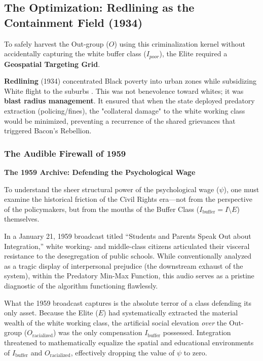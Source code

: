 \documentclass[12pt]{article}
\begin{document}
\subsection{The Optimization: Redlining as the Containment Field (1934)}
To safely harvest the Out-group ($O$) using this criminalization kernel without accidentally capturing the white buffer class ($I_{poor}$), the Elite required a \textbf{Geospatial Targeting Grid}.

\textbf{Redlining} (1934) concentrated Black poverty into urban zones while subsidizing White flight to the suburbs \cite{rothstein, coatesreparations}. This was not benevolence toward whites; it was \textbf{blast radius management}. It ensured that when the state deployed predatory extraction (policing/fines), the "collateral damage" to the white working class would be minimized, preventing a recurrence of the shared grievances that triggered Bacon's Rebellion.

\subsubsection*{The Audible Firewall of 1959}

\textbf{The 1959 Archive: Defending the Psychological Wage}

To understand the sheer structural power of the psychological wage ($\psi$), one must examine the historical friction of the Civil Rights era---not from the perspective of the policymakers, but from the mouths of the Buffer Class ($I_{\text{buffer}} = I \setminus E$) themselves.

In a January 21, 1959 broadcast titled ``Students and Parents Speak Out about Integration,'' white working- and middle-class citizens articulated their visceral resistance to the desegregation of public schools. While conventionally analyzed as a tragic display of interpersonal prejudice (the downstream exhaust of the system), within the Predatory Min-Max Function, this audio serves as a pristine diagnostic of the algorithm functioning flawlessly.

What the 1959 broadcast captures is the absolute terror of a class defending its only asset. Because the Elite ($E$) had systematically extracted the material wealth of the white working class, the artificial social elevation \textit{over} the Out-group ($O_{\text{racialized}}$) was the only compensation $I_{\text{buffer}}$ possessed. Integration threatened to mathematically equalize the spatial and educational environments of $I_{\text{buffer}}$ and $O_{\text{racialized}}$, effectively dropping the value of $\psi$ to zero.
\end{document}
